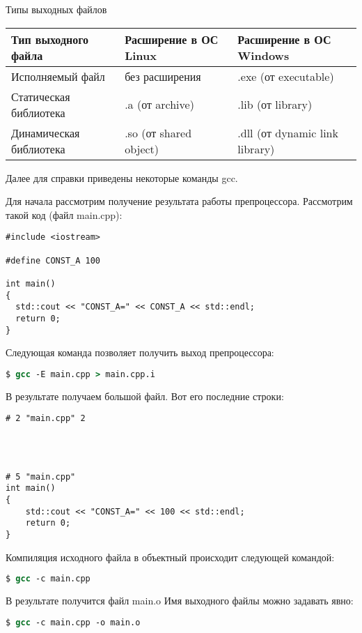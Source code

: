 Типы выходных файлов

\begin{tabular}{|l|l|l|}
	\hline
	\textbf{Тип выходного файла} & \textbf{Расширение в ОС Linux} & \textbf{Расширение в ОС Windows} \\
	\hline
	Исполняемый файл & без расширения & .exe (от executable) \\
	\hline
	Статическая библиотека & .a (от archive) & .lib (от library) \\
	\hline
	Динамическая библиотека & .so (от shared object) & .dll (от dynamic link library) \\
	\hline
\end{tabular}

\clearpage

Далее для справки приведены некоторые команды gcc.

Для начала рассмотрим получение результата работы препроцессора. Рассмотрим такой код (файл main.cpp):


\begin{lstlisting}
#include <iostream>

#define CONST_A 100

int main()
{
  std::cout << "CONST_A=" << CONST_A << std::endl;
  return 0;
}
\end{lstlisting}


Следующая команда позволяет получить выход препроцессора:

\begin{lstlisting}[language=csh]
$ gcc -E main.cpp > main.cpp.i
\end{lstlisting}

В результате получаем большой файл. Вот его последние строки:

\begin{lstlisting}[firstnumber=28636]
# 2 "main.cpp" 2




# 5 "main.cpp"
int main()
{
	std::cout << "CONST_A=" << 100 << std::endl;
	return 0;
}
\end{lstlisting}

Компиляция исходного файла в объектный происходит следующей командой:

\begin{lstlisting}[language=csh]
$ gcc -c main.cpp
\end{lstlisting}

В результате получится файл main.o Имя выходного файлы можно задавать явно:

\begin{lstlisting}[language=csh]
$ gcc -c main.cpp -o main.o
\end{lstlisting}

